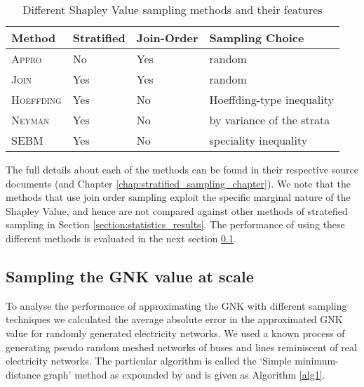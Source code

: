 \begin{table}[]
\centering
\begin{tabular}{|l|l|l|l|}
\hline
Method & Stratified & Join-Order & Sampling Choice \\ \hline
\textsc{Appro} & No & Yes & random\\
\textsc{Join} & Yes & Yes & random\\
\textsc{Hoeffding} & Yes & No & Hoeffding-type inequality \\
\textsc{Neyman} & Yes & No & by variance of the strata \\
\textsc{SEBM} & Yes & No & speciality inequality\\ \hline
\end{tabular}
\caption{Different Shapley Value sampling methods and their features}
\label{table:stratified_sampling_methods}
\end{table}

The full details about each of the methods can be found in their respective source documents \citep{CASTRO2017180,2013arXiv1306.4265M,DBLP:journals/cor/CastroGT09} (and Chapter \ref{chap:stratified_sampling_chapter}).
We note that the methods that use join order sampling exploit the specific marginal nature of the Shapley Value, and hence are not compared against other methods of stratefied sampling in Section \ref{section:statistics_results}.
The performance of using these different methods is evaluated in the next section \ref{section:performance}.

\subsection{Sampling the GNK value at scale}\label{section:performance}

To analyse the performance of approximating the GNK with different sampling techniques we calculated the average absolute error in the approximated GNK value for randomly generated electricity networks.
We used a known process of generating pseudo random meshed networks of buses and lines reminiscent of real electricity networks. The particular algorithm is called the `Simple minimum-distance graph' method as expounded by \cite{hines1} and is given as Algorithm \ref{alg1}.

